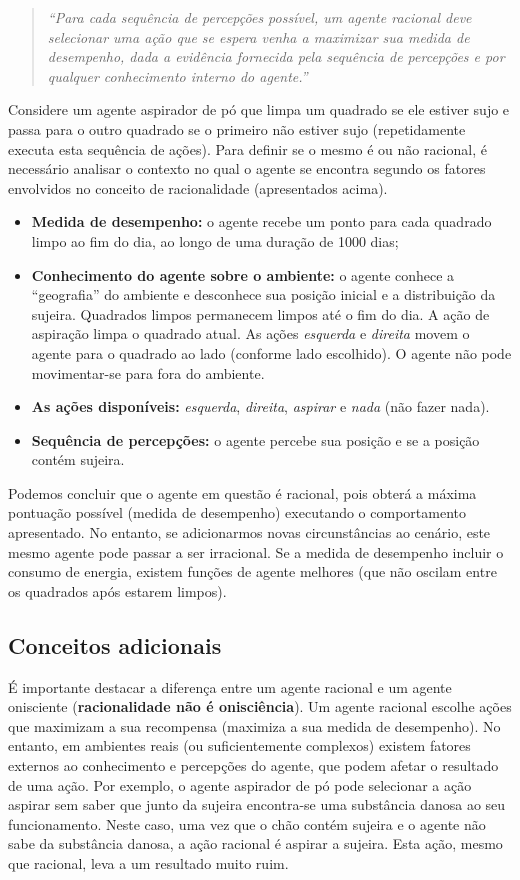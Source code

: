 \begin{quotation}
	\textit{``Para cada sequência de percepções possível, um agente racional deve selecionar uma ação que se espera venha a maximizar sua medida de desempenho, dada a evidência fornecida pela sequência de percepções e por qualquer conhecimento interno do agente.''}
\end{quotation}

Considere um agente aspirador de pó que limpa um quadrado se ele estiver sujo e passa para o outro quadrado se o primeiro não estiver sujo (repetidamente executa esta sequência de ações). Para definir se o mesmo é ou não racional, é necessário analisar o contexto no qual o agente se encontra segundo os fatores envolvidos no conceito de racionalidade (apresentados acima).
\begin{itemize}
	\item \textbf{Medida de desempenho:} o agente recebe um ponto para cada quadrado limpo ao fim do dia, ao longo de uma duração de 1000 dias;
	\item \textbf{Conhecimento do agente sobre o ambiente:} o agente conhece a ``geografia'' do ambiente e desconhece sua posição inicial e a distribuição da sujeira. Quadrados limpos permanecem limpos até o fim do dia. A ação de aspiração limpa o quadrado atual. As ações \textit{esquerda} e \textit{direita} movem o agente para o quadrado ao lado (conforme lado escolhido). O agente não pode movimentar-se para fora do ambiente.
	\item \textbf{As ações disponíveis:} \textit{esquerda}, \textit{direita}, \textit{aspirar} e \textit{nada} (não fazer nada).
	\item \textbf{Sequência de percepções:} o agente percebe sua posição e se a posição contém sujeira.
\end{itemize}

Podemos concluir que o agente em questão é racional, pois obterá a máxima pontuação possível (medida de desempenho) executando o comportamento apresentado. No entanto, se adicionarmos novas circunstâncias ao cenário, este mesmo agente pode passar a ser irracional. Se a medida de desempenho incluir o consumo de energia, existem funções de agente melhores (que não oscilam entre os quadrados após estarem limpos).

\subsection{Conceitos adicionais}

É importante destacar a diferença entre um agente racional e um agente onisciente (\textbf{racionalidade não é onisciência}). Um agente racional escolhe ações que maximizam a sua recompensa (maximiza a sua medida de desempenho). No entanto, em ambientes reais (ou suficientemente complexos) existem fatores externos ao conhecimento e percepções do agente, que podem afetar o resultado de uma ação. Por exemplo, o agente aspirador de pó pode selecionar a ação aspirar sem saber que junto da sujeira encontra-se uma substância danosa ao seu funcionamento. Neste caso, uma vez que o chão contém sujeira e o agente não sabe da substância danosa, a ação racional é aspirar a sujeira. Esta ação, mesmo que racional, leva a um resultado muito ruim.

